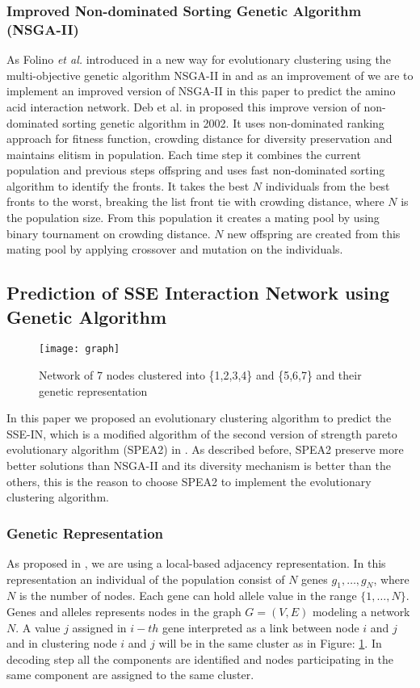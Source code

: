 \subsubsection {Improved Non-dominated Sorting Genetic Algorithm (NSGA-II)}
As Folino \textit{et al.} introduced in a new way for evolutionary clustering using the multi-objective genetic algorithm NSGA-II in \cite{dynmoga} and as an improvement of \cite{dynmoga} we are to implement an improved version of NSGA-II \cite{nsga2} in this paper to predict the amino acid interaction network.
Deb et al. in \cite{nsga2} proposed this improve version of non-dominated sorting genetic algorithm in 2002. It uses non-dominated ranking approach for fitness function, crowding distance for diversity preservation and maintains elitism in population. Each time step it combines the current population and previous steps offspring and uses fast non-dominated sorting algorithm to identify the fronts. It takes the best $N$ individuals from the best fronts to the worst, breaking the list front tie with crowding distance, where $N$ is the population size. From this population it creates a mating pool by using binary tournament on crowding distance. $N$ new offspring are created from this mating pool by applying crossover and mutation on the individuals. 

\subsection{Prediction of SSE Interaction Network using Genetic Algorithm}


\begin{figure}
\centering
\texttt{[image: graph]}
\caption {Network of 7 nodes clustered into \{1,2,3,4\} and \{5,6,7\} and their genetic representation}
\label {fig:graph}
\end{figure}
In this paper we proposed an evolutionary clustering algorithm to predict the SSE-IN, which is a modified algorithm of the second version of strength pareto evolutionary algorithm (SPEA2) in \cite{spea2}. As described before, SPEA2 preserve more better solutions than NSGA-II \cite{nsga2} and its diversity mechanism is better than the others, this is the reason to choose SPEA2 to implement the evolutionary clustering algorithm.
\subsubsection {Genetic Representation}
As proposed in \cite{dynmoga18}, we are using a local-based adjacency representation. In this representation an individual  of the population consist of $N$ genes $g_1,\ldots,g_N$, where $N$ is the number of nodes. Each gene can hold allele value in the range $\{1,\ldots,N\}$. Genes and alleles represents nodes in the graph $G = (V,E)$ modeling a network $N$. A value $j$ assigned in $i-th$ gene interpreted as a link between node $i$ and $j$ and in clustering node $i$ and $j$ will be in the same cluster as in Figure: \ref{fig:graph}. In decoding step all the components are identified and nodes participating in the same component are assigned to the same cluster.

